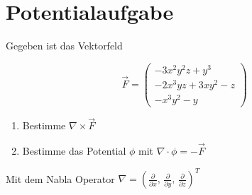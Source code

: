 \section{Potentialaufgabe}
Gegeben ist das Vektorfeld

\begin{equation*}
\vec{F}=\begin{pmatrix} -3x^2y^2z+y^3 \\ -2x^3yz+3xy^2-z \\ -x^3y^2-y\end{pmatrix}
\end{equation*}

\begin{enumerate}[label=\roman*]
\item {Bestimme $\nabla \times \vec{F}$}
\item {Bestimme das Potential $\phi$ mit $\nabla \cdot \phi=-\vec{F}$}
\end{enumerate}
Mit dem Nabla Operator $\nabla = \left( \frac{\partial}{\partial x},\, \frac{\partial}{\partial y},\, \frac{\partial}{\partial z}\right) ^T $
\newpage
